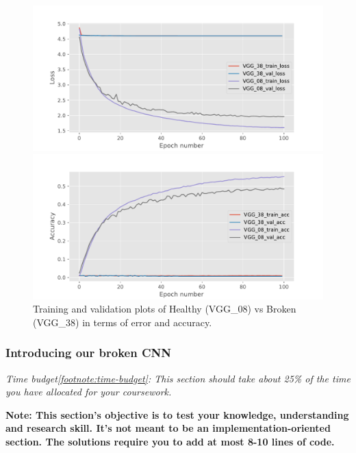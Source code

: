 \documentclass[11pt,]{article}
\begin{document}
\begin{figure}
\centering
\begin{minipage}{.5\textwidth}
  \centering
  \includegraphics[width=1.1\linewidth]{loss_plot.pdf}
\end{minipage}%
\begin{minipage}{.5\textwidth}
  \centering
  \includegraphics[width=1.1\linewidth]{accuracy_plot.pdf}
\end{minipage}
\caption{Training and validation plots of Healthy (VGG\_08) vs Broken (VGG\_38) in terms of error and accuracy.}
\label{brokenvshealthy}
\end{figure}

\subsubsection{Introducing our broken CNN}\label{broken-intro}

\textit{Time budget\cref{footnote:time-budget}: This section should take about 25\% of the time you have allocated for your coursework.}\newline

\textbf{Note: This section's objective is to test your knowledge, understanding and research skill. It's not meant to be an implementation-oriented section. The solutions require you to add at most 8-10 lines of code.}
\end{document}
